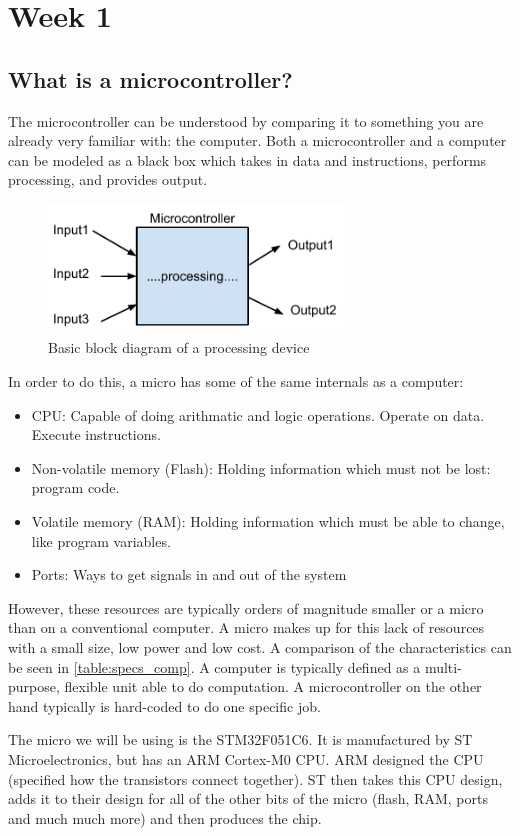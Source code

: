 \section{Week 1}

\subsection{What is a microcontroller?}
The microcontroller can be understood by comparing it to something you are already very familiar with: the computer. Both a microcontroller and a computer can be modeled as a black box which takes in data and instructions, performs processing, and provides output.
\begin{figure}
  \centering
\includegraphics[width=0.7\textwidth]{./week1/processing}
\caption{Basic block diagram of a processing device}
\label{fig:processing_block}
\end{figure}
In order to do this, a micro has some of the same internals as a computer:
\begin{itemize}
  \item CPU: Capable of doing arithmatic and logic operations. Operate on data. Execute instructions. 
  \item Non-volatile memory (Flash): Holding information which must not be lost: program code.
  \item Volatile memory (RAM): Holding information which must be able to change, like program variables.
  \item Ports: Ways to get signals in and out of the system
\end{itemize}
However, these resources are typically orders of magnitude smaller or a micro than on a conventional computer. A micro makes up for this lack of resources with a small size, low power and low cost. A comparison of the characteristics can be seen in \autoref{table:specs_comp}.
A computer is typically defined as a multi-purpose, flexible unit able to do computation. A microcontroller on the other hand typically is hard-coded to do one specific job.

The micro we will be using is the STM32F051C6. It is manufactured by ST Microelectronics, but has an ARM Cortex-M0 CPU. ARM designed the CPU (specified how the transistors connect together). ST then takes this CPU design, adds it to their design for all of the other bits of the micro (flash, RAM, ports and much much more) and then produces the chip.

